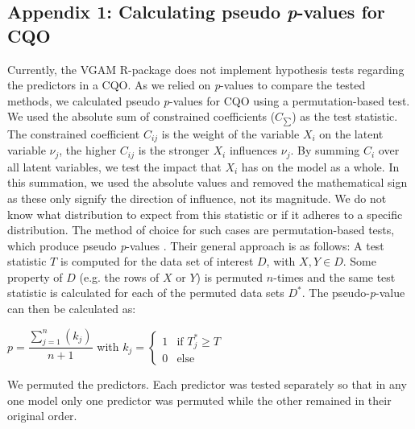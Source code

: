 \documentclass[a4paper,11pt]{article}
\begin{document}
\subsection*{Appendix 1: Calculating pseudo \textit{p}-values for CQO}
 
    Currently, the VGAM R-package \cite[Version 1.1-1,][]{VGAM19} does not implement hypothesis tests regarding the predictors in a CQO. 
    As we relied on \textit{p}-values to compare the tested methods, we calculated pseudo \textit{p}-values for CQO using a permutation-based test. 
    We used the absolute sum of constrained coefficients ($ C_{\sum} $) as the test statistic.
    The constrained coefficient $C_{ij}$ is the weight of the variable $X_i$ on the latent variable $\nu_j$, the higher $C_{ij}$ is the stronger $X_i$ influences $\nu_j$. 
    By summing $C_{i}$ over all latent variables, we test the impact that $X_i$ has on the model as a whole. 
    In this summation, we used the absolute values and removed the mathematical sign as these only signify the direction of influence, not its magnitude. 
    We do not know what distribution to expect from this statistic or if it adheres to a specific distribution. 
    The method of choice for such cases are permutation-based tests, which produce pseudo \textit{p}-values \citep{Legendre2012}. 
    Their general approach is as follows: 
    A test statistic $T$ is computed for the data set of interest $D$, with $X,Y \in D$. 
    Some property of $D$ (e.g. the rows of $X$ or $Y$) is permuted $n$-times and the same test statistic is calculated for each of the permuted data sets $D^*$. 
    The pseudo-\textit{p}-value can then be calculated as: 
    \begin{center} 
    $p = \displaystyle \dfrac{\sum_{j=1}^n(k_j)}{n + 1}$ \hspace{1cm} 
    with 
    \hspace{1cm} $k_j = \begin{cases} 1 &\text{if\ $T^*_j \ge T$} \\ 0 & \text{else} \end{cases}$\\ 
    \end{center}

    We permuted the predictors. 
    Each predictor was tested separately so that in any one model only one predictor was permuted while the other remained in their original order. 
\end{document}
